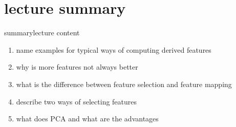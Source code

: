     \section[summary]{lecture summary}
        \begin{frame}{summary}{lecture content}
            \begin{enumerate}
                \item   name examples for typical ways of computing derived features      
                \smallskip
                \item<2->   why is more features not always better
                \smallskip
                \item<3->   what is the difference between feature selection and feature mapping
                \smallskip
                \item<4->   describe two ways of selecting features
                \smallskip
                \item<5->   what does PCA and what are the advantages
            \end{enumerate}
        \end{frame}


